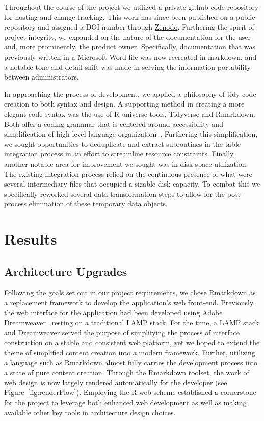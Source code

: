 \documentclass[10pt]{report}
\begin{document}
Throughout the course of the project we utilized a private github code repository for hosting and change tracking. This work has since been published on a public repository and assigned a DOI number through \href{https://zenodo.org/record/4422027}{Zenodo}. Furthering the spirit of project integrity, we expanded on the nature of the documentation for the user and, more prominently, the product owner. Specifically, documentation that was previously written in a Microsoft Word file was now recreated in markdown, and a notable tone and detail shift was made in serving the information portability between administrators.

In approaching the process of development, we applied a philosophy of tidy code creation to both syntax and design. A supporting method in creating a more elegant code syntax was the use of R universe tools, Tidyverse and Rmarkdown. Both offer a coding grammar that is centered around accessibility and simplification of high-level language organization~\cite{wickhamWelcomeTidyverse2019}. Furthering this simplification, we sought opportunities to deduplicate and extract subroutines in the table integration process in an effort to streamline resource constraints. Finally, another notable area for improvement we sought was in disk space utilization. The existing integration process relied on the continuous presence of what were several intermediary files that occupied a sizable disk capacity. To combat this we specifically reworked several data transformation steps to allow for the post-process elimination of these temporary data objects.

\section{Results}

\subsection{Architecture Upgrades}
Following the goals set out in our project requirements, we chose Rmarkdown as a replacement framework to develop the application's web front-end. Previously, the web interface for the application had been developed using Adobe Dreamweaver~\cite{abbottCandidateCancerGene2015a} resting on a traditional LAMP stack. For the time, a LAMP stack and Dreamweaver served the purpose of simplifying the process of interface construction on a stable and consistent web platform, yet we hoped to extend the theme of simplified content creation into a modern framework. Further, utilizing a language such as Rmarkdown almost fully carries the development process into a state of pure content creation. Through the Rmarkdown toolset, the work of web design is now largely rendered automatically for the developer (see Figure~\ref{fig:renderFlow}). Employing the R web scheme established a cornerstone for the project to leverage both enhanced web development as well as making available other key tools in architecture design choices.
\end{document}
